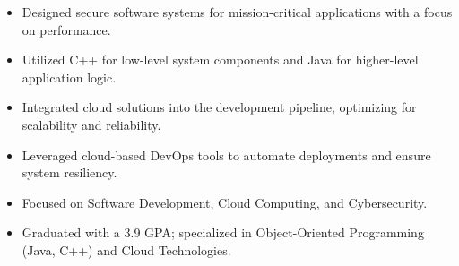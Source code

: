 \par\smallskip
\noindent
\begin{minipage}{20cm}
  \begin{minipage}{9.75cm}
    \begin{itemize}
      \item Designed secure software systems for mission-critical applications with a focus on performance.
      \item Utilized C++ for low-level system components and Java for higher-level application logic.
    \end{itemize}
  \end{minipage}
  \hfill
  \begin{minipage}{9.75cm}
    \begin{itemize}
      \item Integrated cloud solutions into the development pipeline, optimizing for scalability and reliability.
      \item Leveraged cloud-based DevOps tools to automate deployments and ensure system resiliency.
    \end{itemize}
  \end{minipage}
\end{minipage}
\par\smallskip
\divider

\begin{itemize}
  \item Focused on Software Development, Cloud Computing, and Cybersecurity.
\end{itemize}
\divider

\begin{itemize}
  \item Graduated with a 3.9 GPA; specialized in Object-Oriented Programming (Java, C++) and Cloud Technologies.
\end{itemize}

\noindent
\begin{minipage}{20cm}
\end{minipage}


